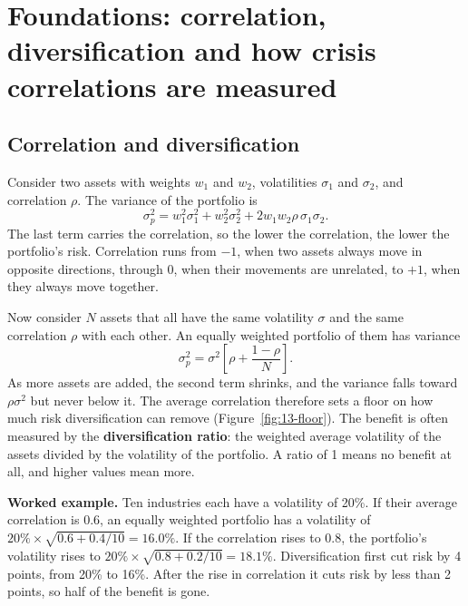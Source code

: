 \section{Foundations: correlation, diversification and how crisis correlations are measured}
\label{sec:13-foundations}

\subsection{Correlation and diversification}

Consider two assets with weights $w_1$ and $w_2$, volatilities $\sigma_1$ and $\sigma_2$, and correlation $\rho$. The variance of the portfolio is
\begin{equation}
  \sigma_p^2 = w_1^2\sigma_1^2 + w_2^2\sigma_2^2 + 2w_1w_2\rho\,\sigma_1\sigma_2.
  \label{eq:13-var2}
\end{equation}
The last term carries the correlation, so the lower the correlation, the lower the portfolio's risk. Correlation runs from $-1$, when two assets always move in opposite directions, through 0, when their movements are unrelated, to $+1$, when they always move together. 

Now consider $N$ assets that all have the same volatility $\sigma$ and the same correlation $\rho$ with each other. An equally weighted portfolio of them has variance
\begin{equation}
  \sigma_p^2 = \sigma^2\left[\rho + \frac{1 - \rho}{N}\right].
  \label{eq:13-varN}
\end{equation}
As more assets are added, the second term shrinks, and the variance falls toward $\rho\sigma^2$ but never below it. The average correlation therefore sets a floor on how much risk diversification can remove (Figure~\ref{fig:13-floor}). The benefit is often measured by the \textbf{diversification ratio}: the weighted average volatility of the assets divided by the volatility of the portfolio. A ratio of 1 means no benefit at all, and higher values mean more.

\textbf{Worked example.} Ten industries each have a volatility of 20\%. If their average correlation is 0.6, an equally weighted portfolio has a volatility of $20\% \times \sqrt{0.6 + 0.4/10} = 16.0\%$. If the correlation rises to 0.8, the portfolio's volatility rises to $20\% \times \sqrt{0.8 + 0.2/10} = 18.1\%$. Diversification first cut risk by 4 points, from 20\% to 16\%. After the rise in correlation it cuts risk by less than 2 points, so half of the benefit is gone.

